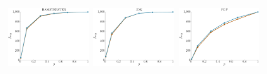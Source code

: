 \documentclass[a4paper]{report}
\newcommand{\wratio}{0.16}
\begin{document}
\includegraphics[width=\wratio\textwidth]{influence/HAMSTERSTER/fs_hamsterster}\hfill
\includegraphics[width=\wratio\textwidth]{influence/JDK/fs_jdk}\hfill
\includegraphics[width=\wratio\textwidth]{influence/PGP/fs_pgp}\hfill
\end{document}
